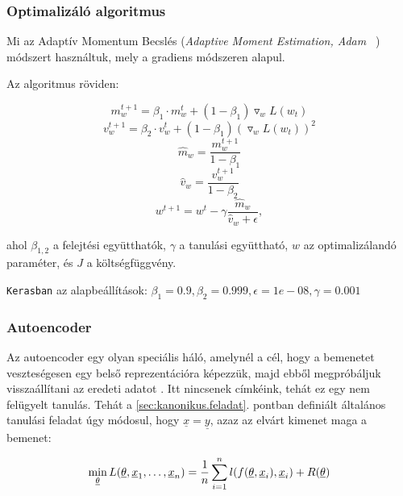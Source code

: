 \subsubsection{Optimalizáló algoritmus}
\label{sec:adam}

Mi az Adaptív Momentum Becslés (\textit{Adaptive Moment Estimation, Adam~\cite{kingma2014adam} }) módszert használtuk, mely a gradiens módszeren alapul.

\noindent
Az algoritmus röviden:

\[  m_w^{t+1} = \beta_1 \cdot m_w^{t} + (1-\beta_1) \triangledown_w L(w_t)  \]
\[  v_w^{t+1} = \beta_2 \cdot v_w^{t} + (1-\beta_1) (\triangledown_w L(w_t))^2  \]
\[  \hat{m}_w = \dfrac{m_w^{t+1}}{1 - \beta_1}  \]
\[  \hat{v}_w = \dfrac{v_w^{t+1}}{1 - \beta_2}  \]
\[ w^{t+1} = w^{t} - \gamma \dfrac{\hat{m}_w}{\hat{v}_w + \epsilon}   ,\]

\noindent
ahol $ \beta_{1,2} $ a felejtési együtthatók, $ \gamma $ a tanulási együttható,
$ w $ az optimalizálandó paraméter, és $ J $ a költségfüggvény.

\noindent
\texttt{Kerasban} az alapbeállítások: 
$ \beta_1=0.9, \beta_2=0.999, \epsilon=1e-08, \gamma=0.001 $



\subsubsection{Autoencoder}

Az autoencoder egy olyan speciális háló, amelynél a cél, hogy a bemenetet veszteségesen egy belső reprezentációra képezzük, majd ebből megpróbáljuk visszaállítani az eredeti adatot \cite{autoencoder1, autoencoder2}. Itt nincsenek címkéink, tehát ez egy nem felügyelt tanulás.
Tehát a \ref{sec:kanonikus.feladat}. pontban definiált általános tanulási feladat úgy módosul, hogy $ \underline{x} = \underline{y} $, azaz az elvárt kimenet maga a bemenet:


\[ 
\min\limits_{\underline{\theta}} L(\underline{\theta}, \underline{x}_1, \dots, \underline{x}_n) = \frac{1}{n}  \sum\limits_{{i}=1}^{n} l(f(\underline{\theta}, \underline{x}_i), \underline{x}_i) + R(\underline{\theta})
\]





